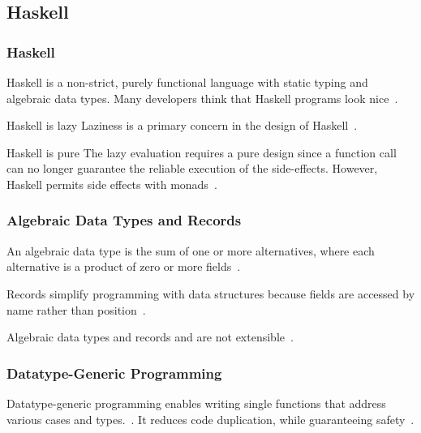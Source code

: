 \subsection{Haskell}
\begin{frame}\frametitle{Haskell}

Haskell is a non-strict, purely functional language with static typing and algebraic data types. Many developers think that Haskell programs look nice~\cite{history-of-haskell}.

\begin{block}{Haskell is lazy}
    Laziness is a primary concern in the design of Haskell~\cite{history-of-haskell}.
\end{block}

\begin{block}{Haskell is pure}
The lazy evaluation requires a pure design since a function call can no longer guarantee the reliable execution of the side-effects. However, Haskell permits side effects with monads~\cite{history-of-haskell}.
\end{block}

\end{frame}

\begin{frame}[allowframebreaks]\frametitle{Algebraic Data Types and Records}

An algebraic data type is the sum of one or more alternatives, where each alternative is a product of zero or more fields~\cite{history-of-haskell}. 
        

Records simplify programming with data structures because fields are accessed by name rather than position~\cite{lw-ext-records}.



Algebraic data types and records and are not extensible~\cite{lw-ext-records,trees-that-grow}. 

\end{frame}

\begin{frame}\frametitle{Datatype-Generic Programming}
    
Datatype-generic programming enables writing single functions that address various cases and types.~\cite{derivable-type-classes}. 
It reduces code duplication, while guaranteeing safety~\cite{datatype-generic-programming}.


\end{frame}